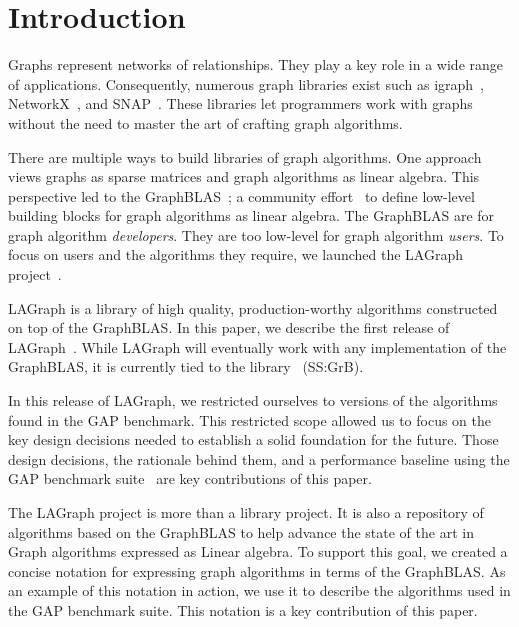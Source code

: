 \section{Introduction}
\label{sec:introduction}

Graphs represent networks of relationships. They play a key role in 
a wide range of applications.   Consequently, numerous graph libraries exist 
such as igraph~\cite{igraph}, NetworkX~\cite{DBLP:reference/snam/X18xv}, and SNAP~\cite{DBLP:journals/tist/LeskovecS16}.
These libraries let programmers work with graphs without the need to master the art of crafting graph algorithms.

There are multiple ways to build libraries of graph algorithms.  One approach
views graphs as sparse matrices and graph algorithms as
linear algebra. This perspective led to the 
GraphBLAS~\cite{DBLP:conf/hpec/MattsonBBBDFFGGHKLLPPRSWY13,DBLP:conf/hpec/MattsonYMBM17}; 
a community effort~\cite{GraphBLASforum} to define low-level building blocks for graph algorithms as linear algebra.
The GraphBLAS are for graph algorithm \emph{developers}.  They are too 
low-level for graph algorithm \emph{users}.  To focus on users and the 
algorithms they require, we launched the
LAGraph project~\cite{DBLP:conf/ipps/MattsonDKBMMY19}.  

LAGraph is a library 
of high quality, production-worthy algorithms constructed on top of
the GraphBLAS.  In this paper, we describe the first release of LAGraph~\cite{LAGraphRepo}.
While LAGraph will eventually work with any implementation of the GraphBLAS, it is currently tied to
the \ssgrb library~\cite{SuiteSparseGraphBLAS} (SS:GrB).

In this release of LAGraph, we restricted ourselves to versions of the algorithms found in the GAP benchmark.
This restricted scope allowed us to focus on the key design decisions needed to establish a solid
foundation for the future.  Those design decisions, the rationale behind them, and a performance baseline 
using the GAP benchmark suite~\cite{DBLP:journals/corr/BeamerAP15} are key contributions of this paper.   

The LAGraph project is more than a library project.   It is also
a repository of algorithms based on the GraphBLAS to help advance the state of the art in 
Graph algorithms expressed as Linear algebra. To support this goal, we created a concise notation for expressing
graph algorithms in terms of the GraphBLAS.   As an example of this notation in action, we use it to describe 
the algorithms used in the GAP benchmark suite.  This notation is a key contribution of this paper.  

